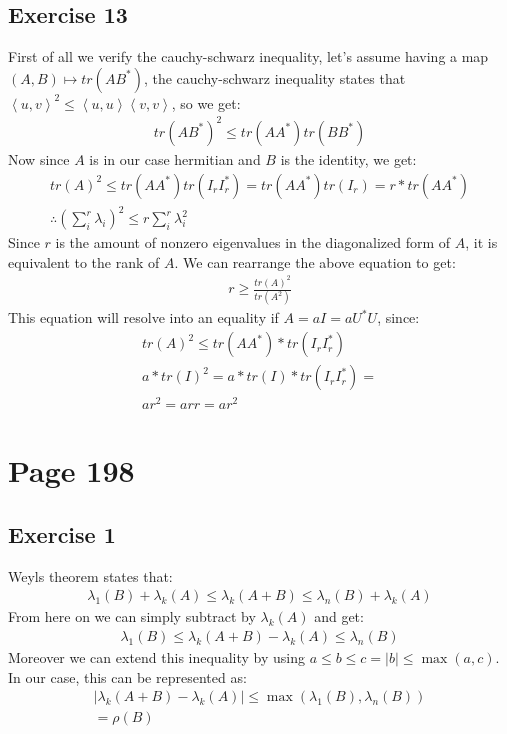 \subsection{Exercise 13}
First of all we verify the cauchy-schwarz inequality, let's assume having a map $(A,B) \mapsto tr(AB^*)$, the cauchy-schwarz inequality states that $\left\langle u,v \right\rangle^2 \leq \left\langle u,u \right\rangle \left\langle v,v \right\rangle$, so we get:
\begin{gather*}
tr(AB^*)^2 \leq tr(AA^*) tr(BB^*)
\end{gather*}
Now since $A$ is in our case hermitian and $B$ is the identity, we get:
\begin{gather*}
tr(A)^2 \leq tr (AA^*) tr( I_r I_r^* )  =   tr (AA^*) tr( I_r ) = r * tr (AA^*)  \\
\therefore \left( \sum_i^r \lambda_i \right)^2 \leq r \sum_i^r \lambda_i^2 
\end{gather*}
Since $r$ is the amount of nonzero eigenvalues in the diagonalized form of $A$, it is equivalent to the rank of $A$. We can rearrange the above equation to get:
\begin{gather*}
r \geq \frac{tr(A)^2}{tr(A^2)}
\end{gather*}
This equation will resolve into an equality if $A = aI = aU^*U$, since:
\begin{gather*}
tr(A)^2 \leq tr (AA^*) * tr( I_r I_r^* )\\
a*tr(I)^2 = a * tr (I) * tr(I_r I_r^*) = \\
a r^2 = a r r = a r^2
\end{gather*}

\section{Page 198}
\subsection{Exercise 1}
Weyls theorem states that:
\begin{gather*}
\lambda_1 (B) + \lambda_k(A) \leq \lambda_k (A+B) \leq \lambda_n(B) + \lambda_k(A) 
\end{gather*}
From here on we can simply subtract by $\lambda_k(A)$ and get:
\begin{gather*}
\lambda_1(B) \leq \lambda_k(A+B) -\lambda_k(A) \leq  \lambda_n(B)
\end{gather*}
Moreover we can extend this inequality by using $a \leq b \leq c = |b| \leq \max(a,c)$.
In our case, this can be represented as:
\begin{gather*}
\left|\lambda_k (A+B) -\lambda_k(A) \right| \leq \max (\lambda_1 (B),\lambda_n (B)) \\
= \rho(B)
\end{gather*}
